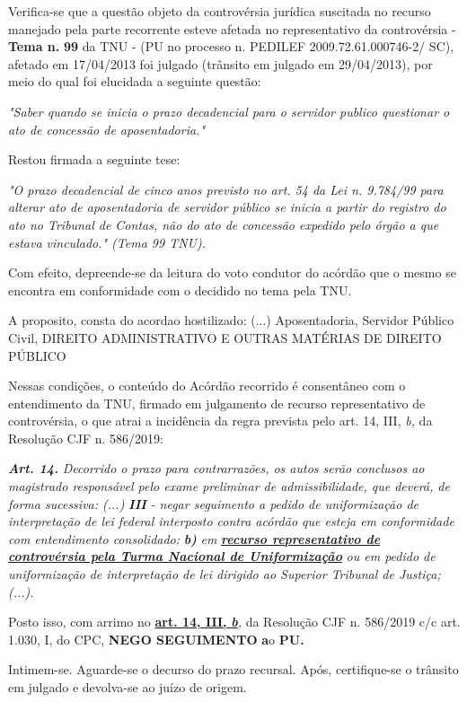 \documentclass[12pt]{article}
\begin{document}
\justifying
\noindent Verifica-se que a questão objeto da controvérsia jurídica suscitada no recurso manejado pela parte recorrente esteve afetada no representativo da controvérsia - \textbf{Tema n. }\textbf{99} da TNU - (PU no processo n. PEDILEF 2009.72.61.000746-2/ SC),  afetado em 17/04/2013 foi julgado (trânsito em julgado em 29/04/2013), por meio do qual foi elucidada a seguinte questão:

\noindent \textit{"Saber quando se inicia o prazo decadencial para o servidor publico questionar o ato de concessão de aposentadoria."}

\noindent Restou firmada a seguinte tese:

\noindent \textit{"O prazo decadencial de cinco anos previsto no art. 54 da Lei n. 9.784/99 para alterar ato de aposentadoria de servidor público se inicia a partir do registro do ato no Tribunal de Contas, não do ato de concessão expedido pelo órgão a que estava vinculado." (Tema 99 TNU).}

\noindent Com efeito, depreende-se da leitura do voto condutor do acórdão que o mesmo se encontra em conformidade com o decidido no  tema pela TNU.

\noindent A proposito, consta do acordao hostilizado: (...) Aposentadoria, Servidor Público Civil, DIREITO ADMINISTRATIVO E OUTRAS MATÉRIAS DE DIREITO PÚBLICO

\noindent Nessas condições, o conteúdo do Acórdão recorrido é consentâneo com o entendimento da TNU, firmado em julgamento de recurso representativo de controvérsia, o que atrai a incidência da regra prevista pelo art. 14, III, \textit{b,} da Resolução CJF n. 586/2019:

\noindent \textit{\textbf{Art. 14.}}\textit{ Decorrido o prazo para contrarrazões, os autos serão conclusos ao magistrado responsável pelo exame preliminar de admissibilidade, que deverá, de forma sucessiva: (...) }\textit{\textbf{III }}\textit{- negar seguimento a pedido de uniformização de interpretação de lei federal interposto contra acórdão que esteja em conformidade com entendimento consolidado: }\textit{\textbf{b)}}\textit{ em }\uline{\textit{\textbf{recurso representativo de controvérsia pela Turma Nacional de Uniformização}}}\textit{ ou em pedido de uniformização de interpretação de lei dirigido ao Superior Tribunal de Justiça;(...).}

\noindent Posto isso, com arrimo no \uline{\textbf{art. 14, III, }}\uline{\textit{\textbf{b}}}\textit{,} da Resolução CJF n. 586/2019 c/c art. 1.030, I, do CPC, \textbf{NEGO SEGUIMENTO }\textbf{a}o\textbf{ PU}\textbf{.}

\noindent Intimem-se. Aguarde-se o decurso do prazo recursal. Após, certifique-se o trânsito em julgado e devolva-se ao juízo de origem.
\end{document}
